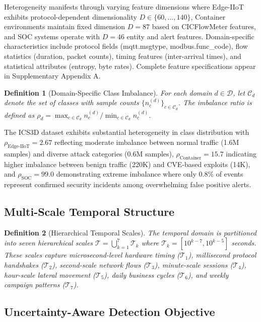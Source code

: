 \documentclass[review,12pt]{elsarticle}
\newtheorem{definition}{Definition}
\begin{document}
Heterogeneity manifests through varying feature dimensions where Edge-IIoT exhibits protocol-dependent dimensionality $D \in \{60,...,140\}$, Container environments maintain fixed dimension $D=87$ based on CICFlowMeter features, and SOC systems operate with $D=46$ entity and alert features. Domain-specific characteristics include protocol fields (mqtt.msgtype, modbus.func\_code), flow statistics (duration, packet counts), timing features (inter-arrival times), and statistical attributes (entropy, byte rates). Complete feature specifications appear in Supplementary Appendix A.

\begin{definition}[Domain-Specific Class Imbalance]
For each domain $d \in \mathcal{D}$, let $\mathcal{C}_d$ denote the set of classes with sample counts $\{n_c^{(d)}\}_{c \in \mathcal{C}_d}$. The imbalance ratio is defined as $\rho_d = \max_{c \in \mathcal{C}_d} n_c^{(d)} / \min_{c \in \mathcal{C}_d} n_c^{(d)}$.
\end{definition}

The ICS3D dataset exhibits substantial heterogeneity in class distribution with $\rho_{\text{Edge-IIoT}} = 2.67$ reflecting moderate imbalance between normal traffic (1.6M samples) and diverse attack categories (0.6M samples), $\rho_{\text{Container}} = 15.7$ indicating higher imbalance between benign traffic (220K) and CVE-based exploits (14K), and $\rho_{\text{SOC}} = 99.0$ demonstrating extreme imbalance where only 0.8\% of events represent confirmed security incidents among overwhelming false positive alerts.

\subsection{Multi-Scale Temporal Structure}

\begin{definition}[Hierarchical Temporal Scales]
The temporal domain is partitioned into seven hierarchical scales $\mathcal{T} = \bigcup_{k=1}^7 \mathcal{T}_k$ where $\mathcal{T}_k = [10^{k-7}, 10^{k-5}]$ seconds. These scales capture microsecond-level hardware timing ($\mathcal{T}_1$), millisecond protocol handshakes ($\mathcal{T}_2$), second-scale network flows ($\mathcal{T}_3$), minute-scale sessions ($\mathcal{T}_4$), hour-scale lateral movement ($\mathcal{T}_5$), daily business cycles ($\mathcal{T}_6$), and weekly campaign patterns ($\mathcal{T}_7$).
\end{definition}

\subsection{Uncertainty-Aware Detection Objective}
\end{document}
